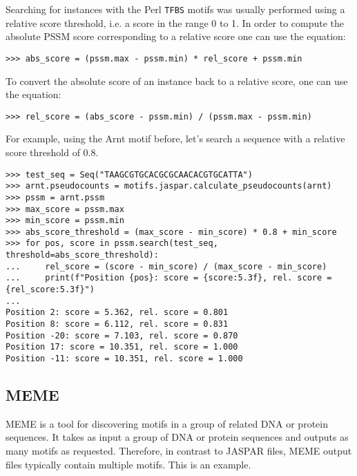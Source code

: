 \begin{itemize}
Searching for instances with the Perl \verb+TFBS+ motifs was usually performed using a relative score threshold, i.e. a score in the range 0 to 1. In order to compute the absolute PSSM score corresponding to a relative score one can use the equation:
\begin{verbatim}
>>> abs_score = (pssm.max - pssm.min) * rel_score + pssm.min
\end{verbatim}
To convert the absolute score of an instance back to a relative score, one can use the equation:
\begin{verbatim}
>>> rel_score = (abs_score - pssm.min) / (pssm.max - pssm.min)
\end{verbatim}
For example, using the Arnt motif before, let's search a sequence with a relative score threshold of 0.8.
\begin{verbatim}
>>> test_seq = Seq("TAAGCGTGCACGCGCAACACGTGCATTA")
>>> arnt.pseudocounts = motifs.jaspar.calculate_pseudocounts(arnt)
>>> pssm = arnt.pssm
>>> max_score = pssm.max
>>> min_score = pssm.min
>>> abs_score_threshold = (max_score - min_score) * 0.8 + min_score
>>> for pos, score in pssm.search(test_seq, threshold=abs_score_threshold):
...     rel_score = (score - min_score) / (max_score - min_score)
...     print(f"Position {pos}: score = {score:5.3f}, rel. score = {rel_score:5.3f}")
...
Position 2: score = 5.362, rel. score = 0.801
Position 8: score = 6.112, rel. score = 0.831
Position -20: score = 7.103, rel. score = 0.870
Position 17: score = 10.351, rel. score = 1.000
Position -11: score = 10.351, rel. score = 1.000
\end{verbatim}
\end{itemize}

\subsection{MEME}

MEME \cite{bailey1994} is a tool for discovering motifs in a group of related
DNA or protein sequences. It takes as input a group of DNA or protein sequences
and outputs as many motifs as requested. Therefore, in contrast to JASPAR
files, MEME output files typically contain multiple motifs. This is an example.

